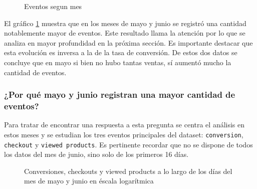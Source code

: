 \documentclass[a4paper]{article}
\begin{document}
\begin{figure}[h!]
	\caption{Eventos segun mes}
	\label{fig:mes}
\end{figure}

El gráfico \ref{fig:mes} muestra que en los meses de mayo y junio se registró una cantidad notablemente mayor de eventos. Este resultado llama la atención por lo que se analiza en mayor profundidad en la próxima sección. Es importante destacar que esta evolución es inversa a la de la tasa de conversión. De estos dos datos se concluye que en mayo si bien no hubo tantas ventas, sí aumentó mucho la cantidad de eventos. 

\subsubsection{¿Por qué mayo y junio registran una mayor cantidad de eventos?}

Para tratar de encontrar una respuesta a esta pregunta se centra el análisis en estos meses y se estudian los tres eventos principales del dataset: \texttt{conversion}, \texttt{checkout} y \texttt{viewed products}. Es pertinente recordar que no se dispone de todos los datos del mes de junio, sino solo de los primeros 16 días.

\begin{figure}[h!]
	\caption{Conversiones, checkouts y viewed products a lo largo de los días del mes de mayo y junio en éscala logarítmica}
	\label{fig:mayojunio}
\end{figure}
\end{document}
